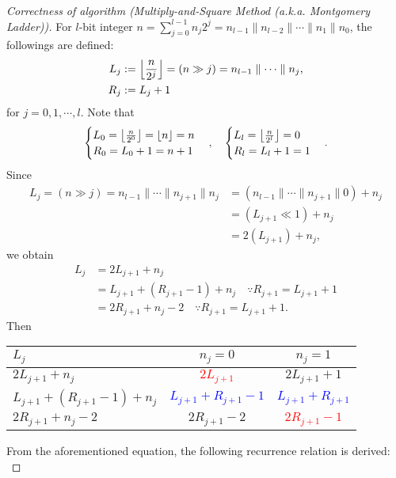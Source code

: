 \documentclass[12pt,openany]{book}
\DeclarePairedDelimiter{\floor}{\lfloor}{\rfloor}
\theoremstyle{definition}
\newcommand{\of}[1]{\left( #1 \right)}
\begin{document}
	\begin{proof}[Correctness of algorithm \textnormal{(Multiply-and-Square Method (a.k.a. Montgomery Ladder))}]	
		For $l$-bit integer $n=\sum_{j=0}^{l-1}n_j2^j=n_{l-1}\parallel n_{l-2}\parallel\cdots\parallel n_{1}\parallel n_0$, the followings are defined: \begin{align*}
		L_j&:=\floor*{\frac{n}{2^j}}=\of{n\gg j}=n_{l-1}\parallel\cdots\parallel n_j,\\
		R_j&:=L_j+1
		\end{align*} for $j=0,1,\cdots, l$. Note that \begin{align*}
		\begin{cases}
		L_0=\floor*{\frac{n}{2^0}}=\floor*{n}=n\\
		R_0=L_0+1=n+1
		\end{cases},\quad
		\begin{cases}
		L_l=\floor*{\frac{n}{2^l}}=0\\
		R_l=L_l+1=1
		\end{cases}.
		\end{align*} Since \begin{align*}
		L_j=(n\gg j)=n_{l-1}\parallel\cdots\parallel n_{j+1}\parallel n_j&=\of{n_{l-1}\parallel\cdots\parallel n_{j+1}\parallel 0} +n_j\\
		&=\of{L_{j+1}\ll 1}+n_j\\
		&=2\of{L_{j+1}}+n_j,
		\end{align*} we obtain \begin{align*}
		L_j&=2L_{j+1}+n_j\\
		&=L_{j+1}+\of{R_{j+1}-1}+n_j\quad\because R_{j+1}=L_{j+1}+1\\
		&=2{R_{j+1}}+n_j-2\quad\because R_{j+1}=L_{j+1}+1.
		\end{align*} Then \begin{center}
			\begin{tabular}{l||c|c}
				\toprule[1.2pt]
				$L_j$ & $n_j=0$ & $n_j=1$\\
				\midrule
				$2L_{j+1}+n_j$ & \textcolor{red}{$2L_{j+1}$} & $2L_{j+1}+1$\\
				\hline
				$L_{j+1}+\of{R_{j+1}-1}+n_j$ & \textcolor{blue}{$L_{j+1}+R_{j+1}-1$} & \textcolor{blue}{$L_{j+1}+R_{j+1}$}\\
				\hline
				$2{R_{j+1}}+n_j-2$ & $2{R_{j+1}}-2$ & \textcolor{red}{$2{R_{j+1}}-1$}\\
				\bottomrule[1.2pt]
			\end{tabular}
		\end{center}
		From the aforementioned equation, the following recurrence relation is derived: \[
\]
\end{proof}
\end{document}
